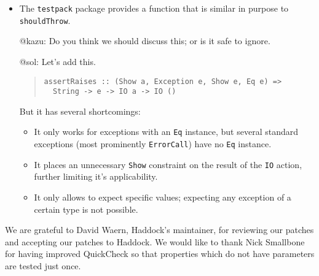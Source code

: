 \documentclass[preprint]{sigplanconf}
\begin{document}
\begin{itemize}
    \item The {\tt testpack} package provides a function that is
        similar in purpose to {\tt shouldThrow}.

        @kazu: Do you think we should discuss this; or is it safe to
        ignore.

        @sol: Let's add this.

\begin{quote}\small\begin{verbatim}
assertRaises :: (Show a, Exception e, Show e, Eq e) =>
  String -> e -> IO a -> IO ()
\end{verbatim}\end{quote}
        But it has several shortcomings:
        \begin{itemize}
            \item
                It only works for exceptions with an {\tt Eq}
                instance, but several standard exceptions (most
                prominently {\tt ErrorCall}) have no {\tt Eq}
                instance.
            \item
                It places an unnecessary {\tt Show} constraint on the
                result of the {\tt IO} action, further limiting it's
                applicability.
            \item
                It only allows to expect specific values; expecting
                any exception of a certain type is not possible.
        \end{itemize}
\end{itemize}





\acks

We are grateful to David Waern, Haddock's maintainer, for reviewing our patches
and accepting our patches to Haddock.
We would like to thank
Nick Smallbone for having improved QuickCheck so that
properties which do not have parameters are tested just once.




\end{document}
